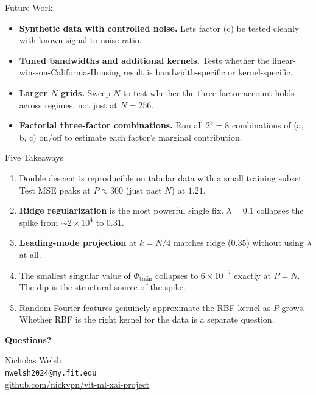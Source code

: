 \documentclass{beamer}
\begin{document}
\begin{frame}{Future Work}
\footnotesize
\begin{itemize}\setlength\itemsep{3pt}
\item \textbf{Synthetic data with controlled noise.} Lets factor (c) be tested cleanly with known signal-to-noise ratio.
\item \textbf{Tuned bandwidths and additional kernels.} Tests whether the linear-wins-on-California-Housing result is bandwidth-specific or kernel-specific.
\item \textbf{Larger $N$ grids.} Sweep $N$ to test whether the three-factor account holds across regimes, not just at $N = 256$.
\item \textbf{Factorial three-factor combinations.} Run all $2^3 = 8$ combinations of (a, b, c) on/off to estimate each factor's marginal contribution.
\end{itemize}
\end{frame}

\begin{frame}{Five Takeaways}
\footnotesize
\begin{enumerate}\setlength\itemsep{2pt}
\item Double descent is reproducible on tabular data with a small training subset. Test MSE peaks at $P \approx 300$ (just past $N$) at $1.21$.
\item \textcolor{ridge}{\textbf{Ridge regularization}} is the most powerful single fix. $\lambda = 0.1$ collapses the spike from $\sim 2 \times 10^4$ to $0.31$.
\item \textcolor{proj}{\textbf{Leading-mode projection}} at $k = N/4$ matches ridge ($0.35$) without using $\lambda$ at all.
\item The smallest singular value of $\Phi_{\text{train}}$ collapses to $6 \times 10^{-7}$ exactly at $P = N$. The dip is the structural source of the spike.
\item Random Fourier features genuinely approximate the RBF kernel as $P$ grows. Whether RBF is the right kernel for the data is a separate question.
\end{enumerate}
\end{frame}

\begin{frame}
\begin{center}
\Large\textbf{Questions?}

\vfill
\normalsize
Nicholas Welsh \\
\texttt{nwelsh2024@my.fit.edu} \\
\vspace{0.5cm}
\href{https://github.com/nickvpn/vit-ml-xai-project}{github.com/nickvpn/vit-ml-xai-project}
\end{center}
\end{frame}
\end{document}
